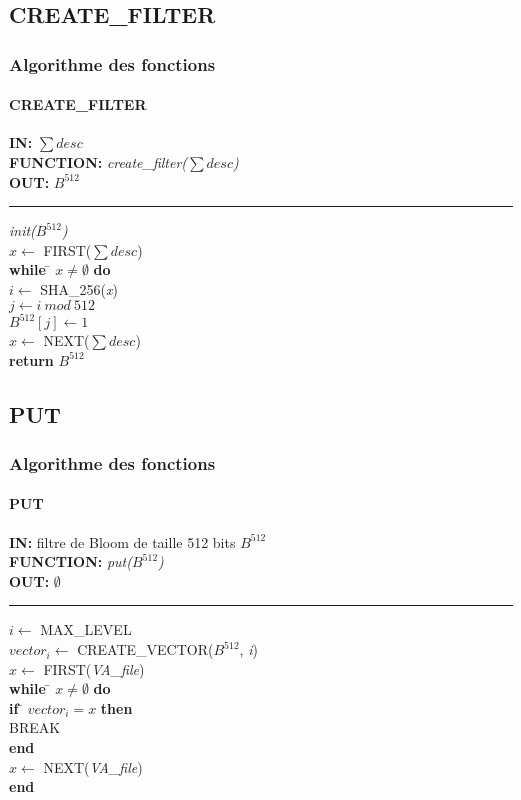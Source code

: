 \documentclass[hyperref={pdfpagemode=FullScreen,colorlinks=true},xcolor=pst,dvips]{beamer}\usepackage[french]{babel}
\begin{document}
	\subsection{CREATE\_FILTER}
	\begin{frame}[shrink]
		\frametitle{Algorithme des fonctions}
		\framesubtitle{CREATE\_FILTER}
		\begin{framed}
		\textbf{IN:} $\sum desc$\\
		\textbf{FUNCTION:} \textit{create\_filter($\sum desc$)}\\
		\textbf{OUT:} \textit{$B^{512}$}\\

		\noindent\rule{\linewidth}{0.5pt}

		\begin{tabbing}
			\textit{init($B^{512}$)}\\
			$x \leftarrow$ FIRST($\sum desc$)\\
			\textbf{while} \= $x \neq \emptyset$ \textbf{do}\\
					\> $i \leftarrow$ SHA\_256(\textit{x})\\
					\> $j \leftarrow i\ mod\ 512$\\
					\> $B^{512}[j]\leftarrow 1$\\
					\> $x \leftarrow$ NEXT($\sum desc$)\\
			\textbf{return} $B^{512}$\\
	    	\end{tabbing}		
	\end{framed}
	\end{frame}
	
	\subsection{PUT}
	\begin{frame}[shrink]
		\frametitle{Algorithme des fonctions}
		\framesubtitle{PUT}
		\begin{framed}
		\textbf{IN:} filtre de Bloom de taille 512 bits $B^{512}$\\
		\textbf{FUNCTION:} \textit{put($B^{512}$)}\\
		\textbf{OUT:} \textit{$\emptyset$}\\

		\noindent\rule{\linewidth}{0.5pt}

		\begin{tabbing}
			$i \leftarrow$ MAX\_LEVEL\\
			$vector_i \leftarrow$ CREATE\_VECTOR($B^{512}$, \textit{i})\\
			$x \leftarrow$ FIRST(\textit{VA\_file})\\
			\textbf{while }\= $x \neq \emptyset$ \textbf{do}\\
					\> \textbf{if }\= $vector_i = x$\textbf{ then}\\
					\> \> BREAK\\
					\> \textbf{end}\\
					\> $x \leftarrow$ NEXT(\textit{VA\_file})\\
			\textbf{end}	\\	
	    	\end{tabbing}		
	\end{framed}
	\end{frame}
	
\end{document}
